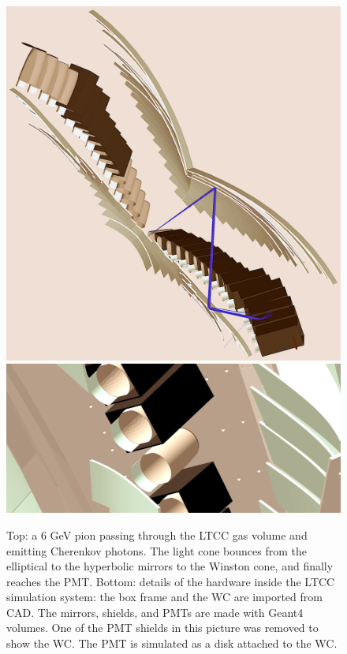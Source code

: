 \begin{figure}
	\centering
	\includegraphics[width=0.99\columnwidth, keepaspectratio]{img/ltccGeometry.png}
	\includegraphics[width=0.99\columnwidth, keepaspectratio]{img/ltccDetail.png}
	\caption{Top: a 6 GeV pion passing through the LTCC gas volume and emitting Cherenkov photons. The light cone
            bounces from the elliptical to the hyperbolic mirrors to the Winston cone, and finally reaches the PMT.
            Bottom: details of the hardware inside the LTCC simulation system: the box frame and the WC are
            imported from CAD. The mirrors, shields, and PMTs are made with Geant4 volumes. One of the PMT shields
            in this picture was removed to show the WC. The PMT is simulated as a disk attached to the WC. }
	\label{fig:ltccGeometry}
\end{figure}

